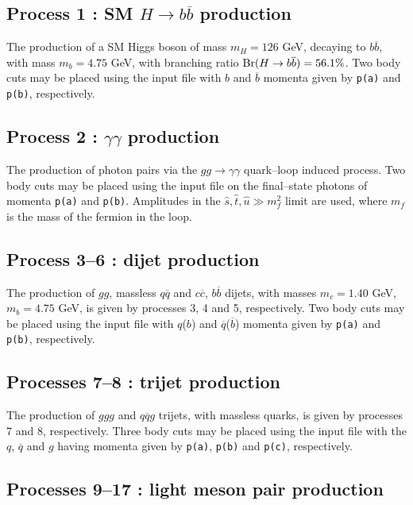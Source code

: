 \documentclass[12pt]{article}
\begin{document}
\subsection{Process 1 : SM $H\to b\overline{b}$ production}

The production of a SM Higgs boson of mass $m_H=126$ GeV, decaying to $b\overline{b}$, with mass $m_b=4.75$ GeV, with branching ratio 
${\rm Br}(H\to b\overline{b})=56.1\%$. Two body cuts may be placed using the input file with $b$ and $\overline{b}$ momenta given by 
\texttt{p(a)} and \texttt{p(b)}, respectively.

\subsection{Process 2 : $\gamma\gamma$ production}

The production of photon pairs via the $gg\to\gamma\gamma$ quark--loop induced process. Two body cuts may be placed using the input file on the 
final--state photons of momenta  \texttt{p(a)} and \texttt{p(b)}.  Amplitudes in the $\hat{s},\hat{t},\hat{u} \gg m_f^2$ limit are used, where 
$m_f$ is the mass of the fermion in the loop.

\subsection{Process 3--6 : dijet production}

The production of $gg$, massless $q\overline{q}$ and $c\overline{c}$, $b\overline{b}$ dijets, with masses $m_c=1.40$ GeV, $m_b=4.75$ GeV, is given
 by processes 3, 4 and 5, respectively. Two body cuts may be placed using the input file with $q$($b$) and $\overline{q}$($\overline{b}$) momenta 
 given by \texttt{p(a)} and \texttt{p(b)}, respectively.

\subsection{Processes 7--8 : trijet production}

The production of $ggg$ and $q\overline{q}g$ trijets, with massless quarks, is given by processes 7 and 8, respectively. Three body cuts may be 
placed using the input file with the $q$, $\overline{q}$ and $g$ having momenta given by \texttt{p(a)}, \texttt{p(b)} and \texttt{p(c)}, respectively.

\subsection{Processes 9--17 : light meson pair production}
\end{document}
